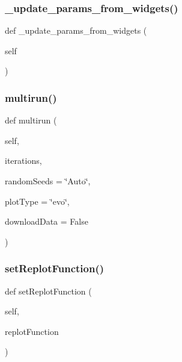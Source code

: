 \subsubsection{\texorpdfstring{\+\_\+update\+\_\+params\+\_\+from\+\_\+widgets()}{\_update\_params\_from\_widgets()}}
{\footnotesize\ttfamily def \+\_\+update\+\_\+params\+\_\+from\+\_\+widgets (\begin{DoxyParamCaption}\item[{}]{self }\end{DoxyParamCaption})\hspace{0.3cm}{\ttfamily [private]}}

\mbox{\label{class_mu_mo_t_1_1_mu_mo_tcontroller_aa74bfc216071ff6b768c7a584917bfc6}} 
\subsubsection{\texorpdfstring{multirun()}{multirun()}}
{\footnotesize\ttfamily def multirun (\begin{DoxyParamCaption}\item[{}]{self,  }\item[{}]{iterations,  }\item[{}]{random\+Seeds = {\ttfamily \char`\"{}Auto\char`\"{}},  }\item[{}]{plot\+Type = {\ttfamily \char`\"{}evo\char`\"{}},  }\item[{}]{download\+Data = {\ttfamily False} }\end{DoxyParamCaption})}

\mbox{\label{class_mu_mo_t_1_1_mu_mo_tcontroller_aafc1e69cab41071217fe6676a8089249}} 
\subsubsection{\texorpdfstring{set\+Replot\+Function()}{setReplotFunction()}}
{\footnotesize\ttfamily def set\+Replot\+Function (\begin{DoxyParamCaption}\item[{}]{self,  }\item[{}]{replot\+Function }\end{DoxyParamCaption})}

